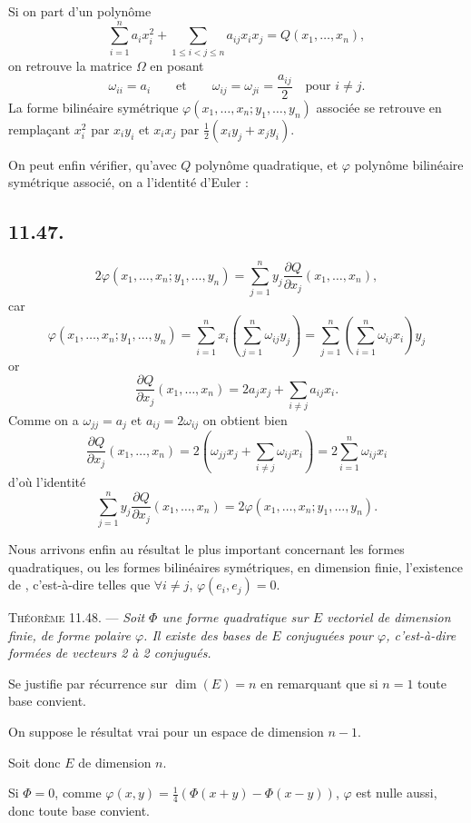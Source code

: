 Si on part d'un polynôme
\[
\sum_{i=1}^na_ix_i^2+\sum_{1\le i<j\le n}a_{ij}x_ix_j=Q(x_1,\ldots,x_n),
\]
on retrouve la matrice $\Omega$ en posant
\[
\omega_{ii}=a_i\qquad\text{et}\qquad \omega_{ij}=\omega_{ji}=\frac{a_{ij}}2\quad\text{pour }i\ne j.
\]
La forme bilinéaire symétrique $\varphi(x_1,\ldots,x_n;y_1,\ldots,y_n)$ associée se retrouve en remplaçant $x_i^2$ par $x_iy_i$ et $x_ix_j$ par $\frac12(x_iy_j+x_jy_i)$.

On peut enfin vérifier, qu'avec $Q$ polynôme quadratique, et $\varphi$ polynôme bilinéaire symétrique associé, on a l'identité d'Euler :

\subsection*{11.47.}
\[
2\varphi(x_1,\ldots,x_n;y_1,\ldots,y_n)
=\sum_{j=1}^n y_j\frac{\partial Q}{\partial x_j}(x_1,\ldots,x_n),
\]
car
\[
\varphi(x_1,\ldots,x_n;y_1,\ldots,y_n)
=\sum_{i=1}^nx_i\left(\sum_{j=1}^n\omega_{ij}y_j\right)
=\sum_{j=1}^n\left(\sum_{i=1}^n\omega_{ij}x_i\right)y_j
\]
or
\[
\frac{\partial Q}{\partial x_j}(x_1,\ldots,x_n)=2a_jx_j+\sum_{i\ne j}a_{ij}x_i.
\]
Comme on a $\omega_{jj}=a_j$ et $a_{ij}=2\omega_{ij}$ on obtient bien
\[
\frac{\partial Q}{\partial x_j}(x_1,\ldots,x_n)
=2\left(\omega_{jj}x_j+\sum_{i\ne j}\omega_{ij}x_i\right)
=2\sum_{i=1}^n\omega_{ij}x_i
\]
d'où l'identité
\[
\sum_{j=1}^ny_j\frac{\partial Q}{\partial x_j}(x_1,\ldots,x_n)
=2\varphi(x_1,\ldots,x_n;y_1,\ldots,y_n).
\]

Nous arrivons enfin au résultat le plus important concernant les formes quadratiques, ou les formes bilinéaires symétriques, en dimension finie, l'existence de , c'est-à-dire telles que $\forall i\ne j$, $\varphi(e_i,e_j)=0$.

\medskip\noindent\textsc{Théorème 11.48.} --- \emph{Soit $\Phi$ une forme quadratique sur $E$ vectoriel de dimension finie, de forme polaire $\varphi$. Il existe des bases de $E$ conjuguées pour $\varphi$, c'est-à-dire formées de vecteurs 2 à 2 conjugués.}

Se justifie par récurrence sur $\dim(E)=n$ en remarquant que si $n=1$ toute base convient.

On suppose le résultat vrai pour un espace de dimension $n-1$.

Soit donc $E$ de dimension $n$.

Si $\Phi=0$, comme $\varphi(x,y)=\frac14(\Phi(x+y)-\Phi(x-y))$, $\varphi$ est nulle aussi, donc toute base convient.

